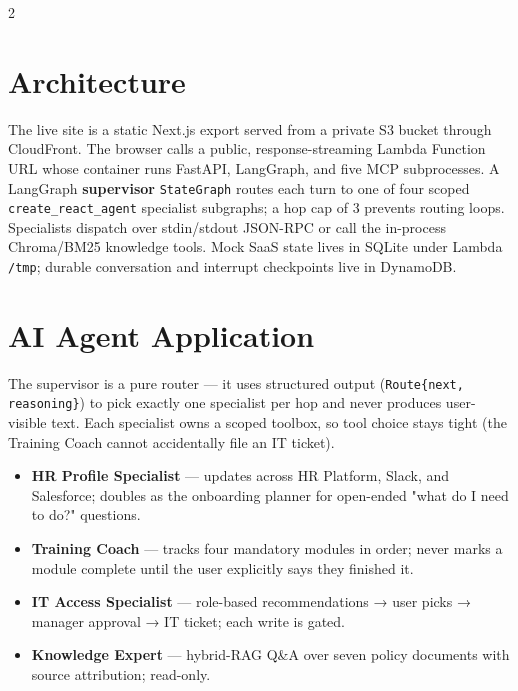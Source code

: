 \documentclass[10pt,a4paper]{article}
\begin{document}
\vspace{3pt}
\begin{multicols}{2}

\section{Architecture}

The live site is a static Next.js export served from a private S3 bucket through CloudFront. The browser calls a public, response-streaming Lambda Function URL whose container runs FastAPI, LangGraph, and five MCP subprocesses. A LangGraph \textbf{supervisor} \texttt{StateGraph} routes each turn to one of four scoped \texttt{create\_react\_agent} specialist subgraphs; a hop cap of 3 prevents routing loops. Specialists dispatch over stdin/stdout JSON-RPC or call the in-process Chroma/BM25 knowledge tools. Mock SaaS state lives in SQLite under Lambda \texttt{/tmp}; durable conversation and interrupt checkpoints live in DynamoDB.

\section{AI Agent Application}

The supervisor is a pure router — it uses structured output (\texttt{Route\{next, reasoning\}}) to pick exactly one specialist per hop and never produces user-visible text. Each specialist owns a scoped toolbox, so tool choice stays tight (the Training Coach cannot accidentally file an IT ticket).

\begin{itemize}
  \item \textbf{HR Profile Specialist} — updates across HR Platform, Slack, and Salesforce; doubles as the onboarding planner for open-ended "what do I need to do?" questions.
  \item \textbf{Training Coach} — tracks four mandatory modules in order; never marks a module complete until the user explicitly says they finished it.
  \item \textbf{IT Access Specialist} — role-based recommendations → user picks → manager approval → IT ticket; each write is gated.
  \item \textbf{Knowledge Expert} — hybrid-RAG Q\&A over seven policy documents with source attribution; read-only.
\end{itemize}


\end{multicols}
\end{document}

